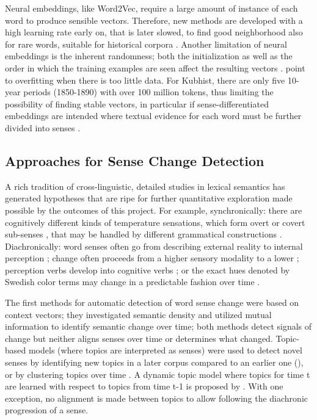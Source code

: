 \documentclass[12pt,twoside,a4paper]{article}
\begin{document}
    Neural embeddings, like Word2Vec, require a large amount of instance of each word to produce sensible vectors. Therefore, new methods are developed with a high learning rate early on, that is later slowed, to find good neighborhood also for rare words, suitable for historical corpora \citep{Herbelot-EMNLP2017}.
    Another limitation of neural embeddings is the inherent randomness; both the initialization as well as the order in which the training examples are seen affect the resulting vectors \citep{HellrichH16-Coling}.  \cite{bamler17} point to overfitting when there is too little data.  
	 	For Kubhist, there are only five 10-year periods (1850-1890) with over 100 million tokens, thus limiting the possibility of finding stable vectors, in particular if sense-differentiated embeddings are intended where textual evidence for each word must be further divided into senses \citep{Tahmasebi-DHN2018}. 
	
	\subsection{Approaches for Sense Change Detection}

A rich tradition of cross-linguistic, detailed studies in lexical semantics has generated hypotheses that are ripe for further quantitative exploration made possible by the outcomes of this project. For example, synchronically:  there are cognitively different kinds of temperature sensations, which form overt or covert sub-senses
\citep{Koptjevskaja-Tamm_2015}, that may be handled by different grammatical constructions \citep{Pustet_2015}.  Diachronically: 
 word senses often go from describing external reality to internal perception \citep{traugott_regularity_2002}; change often proceeds from a higher sensory modality to a lower \citep{viberg_studier_1980}; perception verbs develop into cognitive verbs \citep{sweetser_etymology_1991-a}; or the exact hues denoted by Swedish color terms may change in a predictable fashion over time \citep{vejdemo_triangulating_2017-a}.     


	The first methods for automatic detection of word sense change were based on context vectors; they investigated semantic density \citep{Sagi} and utilized mutual information \citep{Gulordava} to identify semantic change over time; both methods detect signals of change but neither aligns senses over time or determines what changed. 
	Topic-based models (where topics are interpreted as senses) were used to detect novel senses by identifying new topics in a later corpus compared to an earlier one (\cite{NovelSenses,cook:Coling}), or by clustering topics over time \citep{Wijaya}. A dynamic topic model where topics for time t are learned with respect to topics from time t-1 is proposed by \cite{frermann2016bayesian}.
	With one exception, no alignment is made between topics to allow following the diachronic progression of a sense.  
	
\end{document}
